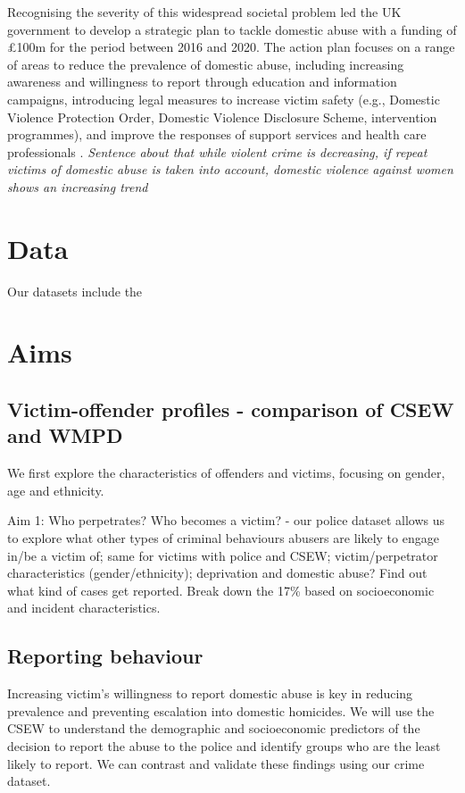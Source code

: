 \documentclass[12pt, letterpaper]{article}
\begin{document}
Recognising the severity of this widespread societal problem led the UK government to develop a strategic plan to tackle domestic abuse with a funding of £100m for the period between 2016 and 2020. The action plan focuses on a range of areas to reduce the prevalence of domestic abuse, including increasing awareness and willingness to report through education and information campaigns, introducing legal measures to increase victim safety (e.g., Domestic Violence Protection Order, Domestic Violence Disclosure Scheme, intervention programmes), and improve the responses of support services and health care professionals \cite{vawag}. \textit{Sentence about that while violent crime is decreasing, if repeat victims of domestic abuse is taken into account, domestic violence against women shows an increasing trend}

\section{Data}

Our datasets include the 




\section{Aims}

\subsection{Victim-offender profiles - comparison of CSEW and WMPD}

We first explore the characteristics of offenders and victims, focusing on gender, age and ethnicity. 


Aim 1: Who perpetrates? Who becomes a victim? - our police dataset allows us to explore what other types of criminal behaviours abusers are likely to engage in/be a victim of; same for victims with police and CSEW; victim/perpetrator characteristics (gender/ethnicity); deprivation and domestic abuse? Find out what kind of cases get reported. Break down the 17\% based on socioeconomic and incident characteristics.


\subsection{Reporting behaviour}

Increasing victim's willingness to report domestic abuse is key in reducing prevalence and preventing escalation into domestic homicides. We will use the CSEW to understand the demographic and socioeconomic predictors of the decision to report the abuse to the police and identify groups who are the least likely to report. We can contrast and validate these findings using our crime dataset.
\end{document}
